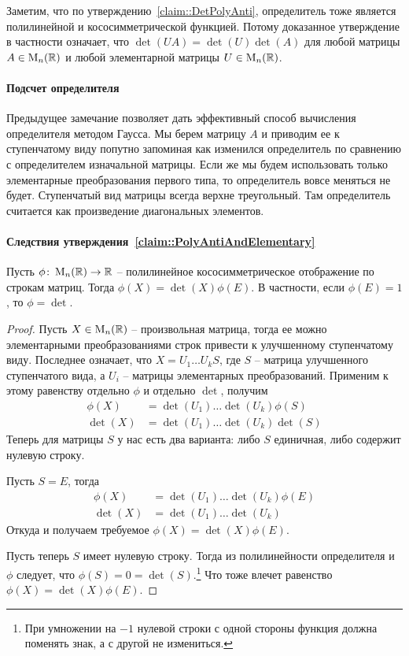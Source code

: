 Заметим, что по утверждению~\ref{claim::DetPolyAnti}, определитель тоже является полилинейной и кососимметрической функцией. Потому доказанное утверждение в частности означает, что $\det(UA) = \det(U)\det(A)$ для любой матрицы $A\in\operatorname{M}_{n}(\mathbb R)$ и любой элементарной матрицы $U\in\operatorname{M}_{n}(\mathbb R)$.

\paragraph{Подсчет определителя}

Предыдущее замечание позволяет дать эффективный способ вычисления определителя методом Гаусса. Мы берем матрицу $A$ и приводим ее к ступенчатому виду попутно запоминая как изменился определитель по сравнению с определителем изначальной матрицы. Если же мы будем использовать только элементарные преобразования первого типа, то определитель вовсе меняться не будет. Ступенчатый вид матрицы всегда верхне треугольный. Там определитель считается как произведение диагональных элементов.


\paragraph{Следствия утверждения~\ref{claim::PolyAntiAndElementary}}

\begin{claim}\label{claim::PolyAntiUnique}
Пусть $\phi\colon \operatorname{M}_{n}(\mathbb R)\to \mathbb R$ -- полилинейное кососимметрическое отображение по строкам матриц. Тогда $\phi(X) = \det(X)\phi(E)$. В частности, если $\phi(E) = 1$, то $\phi = \det$.
\end{claim}
\begin{proof}
Пусть $X\in\operatorname{M}_{n}(\mathbb R)$ -- произвольная матрица, тогда ее можно элементарными преобразованиями строк привести к улучшенному ступенчатому виду. Последнее означает, что $X = U_1 \ldots U_k S$, где $S$ -- матрица улучшенного ступенчатого вида, а $U_i$ -- матрицы элементарных преобразований. Применим к этому равенству отдельно $\phi$ и отдельно $\det$, получим
\begin{align*}
\phi(X) &= \det(U_1)\ldots \det(U_k)\phi(S)\\
\det(X) &= \det(U_1)\ldots \det(U_k)\det(S)
\end{align*}
Теперь для матрицы $S$ у нас есть два варианта: либо $S$ единичная, либо содержит нулевую строку.

Пусть $S = E$, тогда
\begin{align*}
\phi(X) &= \det(U_1)\ldots \det(U_k)\phi(E)\\
\det(X) &= \det(U_1)\ldots \det(U_k)
\end{align*}
Откуда и получаем требуемое $\phi(X) = \det(X)\phi(E)$.

Пусть теперь $S$ имеет нулевую строку. Тогда из полилинейности определителя и $\phi$ следует, что $\phi(S) = 0 =\det(S)$.\footnote{При умножении на $-1$ нулевой строки с одной стороны функция должна поменять знак, а с другой не измениться.}  Что тоже влечет равенство $\phi(X) = \det(X)\phi(E)$.
\end{proof}


